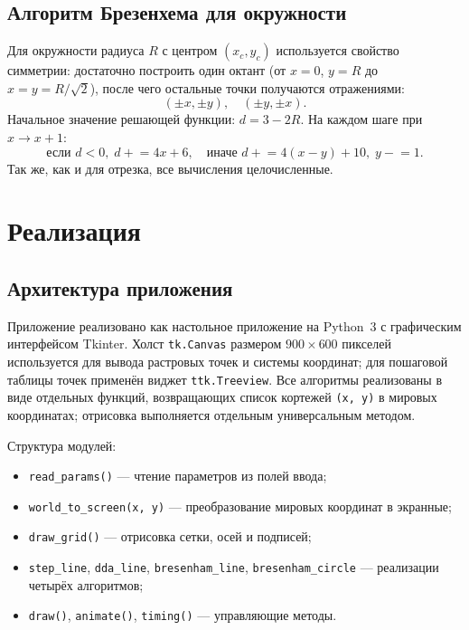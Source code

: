 \documentclass[a4paper,14pt]{extarticle}
\begin{document}
\subsection{Алгоритм Брезенхема для окружности}
Для окружности радиуса $R$ с центром $(x_c, y_c)$ используется свойство симметрии: достаточно построить один октант (от $x = 0$, $y = R$ до $x = y = R/\sqrt{2}$), после чего остальные точки получаются отражениями:
\[
(\pm x, \pm y),\quad (\pm y, \pm x).
\]
Начальное значение решающей функции: $d = 3 - 2R$. На каждом шаге при $x \to x+1$:
\[
\text{если } d < 0,\; d \mathrel{+}= 4x + 6,\quad
\text{иначе } d \mathrel{+}= 4(x - y) + 10,\; y \mathrel{-}= 1.
\]
Так же, как и для отрезка, все вычисления целочисленные.

\section{Реализация}

\subsection{Архитектура приложения}
Приложение реализовано как настольное приложение на Python~3 с графическим интерфейсом Tkinter. Холст \texttt{tk.Canvas} размером $900\times600$ пикселей используется для вывода растровых точек и системы координат; для пошаговой таблицы точек применён виджет \texttt{ttk.Treeview}. Все алгоритмы реализованы в виде отдельных функций, возвращающих список кортежей \texttt{(x, y)} в мировых координатах; отрисовка выполняется отдельным универсальным методом.

Структура модулей:
\begin{itemize}
  \item \texttt{read\_params()} — чтение параметров из полей ввода;
  \item \texttt{world\_to\_screen(x, y)} — преобразование мировых координат в экранные;
  \item \texttt{draw\_grid()} — отрисовка сетки, осей и подписей;
  \item \texttt{step\_line}, \texttt{dda\_line}, \texttt{bresenham\_line}, \texttt{bresenham\_circle} — реализации четырёх алгоритмов;
  \item \texttt{draw()}, \texttt{animate()}, \texttt{timing()} — управляющие методы.
\end{itemize}
\end{document}
